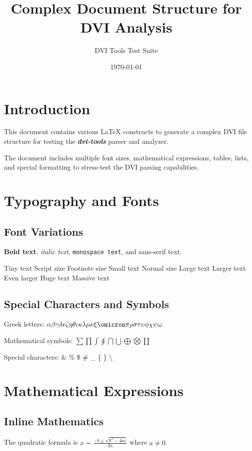 \documentclass[12pt]{article}
\title{Complex Document Structure for DVI Analysis}
\author{DVI Tools Test Suite}
\date{\today}
\newcommand{\highlight}[1]{\textbf{\textit{#1}}}
\begin{document}
\maketitle

\tableofcontents
\newpage

\section{Introduction}
This document contains various \LaTeX{} constructs to generate a complex DVI file structure for testing the \highlight{dvi-tools} parser and analyzer.

The document includes multiple font sizes, mathematical expressions, tables, lists, and special formatting to stress-test the DVI parsing capabilities.

\section{Typography and Fonts}

\subsection{Font Variations}
\textbf{Bold text}, \textit{italic text}, \texttt{monospace text}, and \textsf{sans-serif text}.

{\tiny Tiny text} {\scriptsize Script size} {\footnotesize Footnote size} {\small Small text} {\normalsize Normal size} {\large Large text} {\Large Larger text} {\LARGE Even larger} {\huge Huge text} {\Huge Massive text}

\subsection{Special Characters and Symbols}
Greek letters: $\alpha \beta \gamma \delta \epsilon \zeta \eta \theta \iota \kappa \lambda \mu \nu \xi \omicron \pi \rho \sigma \tau \upsilon \phi \chi \psi \omega$

Mathematical symbols: $\sum \prod \int \oint \bigcap \bigcup \bigoplus \bigotimes \coprod$

Special characters: \& \% \$ \# \_ \{ \} \textbackslash

\section{Mathematical Expressions}

\subsection{Inline Mathematics}
The quadratic formula is $x = \frac{-b \pm \sqrt{b^2 - 4ac}}{2a}$ where $a \neq 0$.
\end{document}
